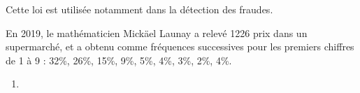 {{\begin{center}
\begin{tikzpicture}[x=1cm,y=1cm,font=\small]
\end{tikzpicture}
\end{center}

Cette loi est utilisée notamment dans la détection des fraudes. 

En 2019, le mathématicien Mickäel Launay a relevé 1226 prix dans un supermarché, et a obtenu comme fréquences successives pour les premiers chiffres de 1 à 9 : 32\%, 26\%, 15\%, 9\%, 5\%, 4\%, 3\%, 2\%, 4\%.
}


\begin{enumerate}
    \item {}
\end{enumerate}

}
